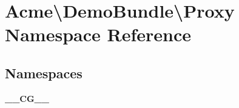 \section{Acme\textbackslash{}Demo\+Bundle\textbackslash{}Proxy Namespace Reference}
\label{namespace_acme_1_1_demo_bundle_1_1_proxy}
\subsection*{Namespaces}
\begin{DoxyCompactItemize}
\item 
 {\bf \+\_\+\+\_\+\+C\+G\+\_\+\+\_\+}
\end{DoxyCompactItemize}
